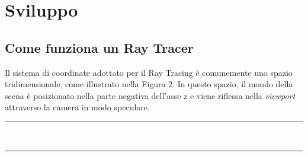\documentclass[main.tex]{subfiles}
\begin{document}
\section{Sviluppo}\label{sec:sviluppo}
\subsection{Come funziona un Ray Tracer}

\begin{minipage}{0.6\textwidth}
\hspace*{0.25in}Il sistema di coordinate adottato per il Ray Tracing è comunemente uno spazio tridimensionale, come illustrato nella Figura 2. In questo spazio, il mondo della scena è posizionato nella parte negativa dell'asse z e viene riflessa nella \textit{viewport} attraverso la camera in modo speculare.
\end{minipage}%
\begin{minipage}{0.4\textwidth}
    \centering
    \captionsetup{aboveskip=0pt}
    \vspace{-14pt}\rule{0.9\linewidth}{0.4pt}
\end{minipage}\\
\begin{minipage}{0.4\textwidth}
    \centering
    \captionsetup{aboveskip=0pt}
    \vspace{-14pt}\rule{0.9\linewidth}{0.4pt}
\end{minipage}%
\end{document}

